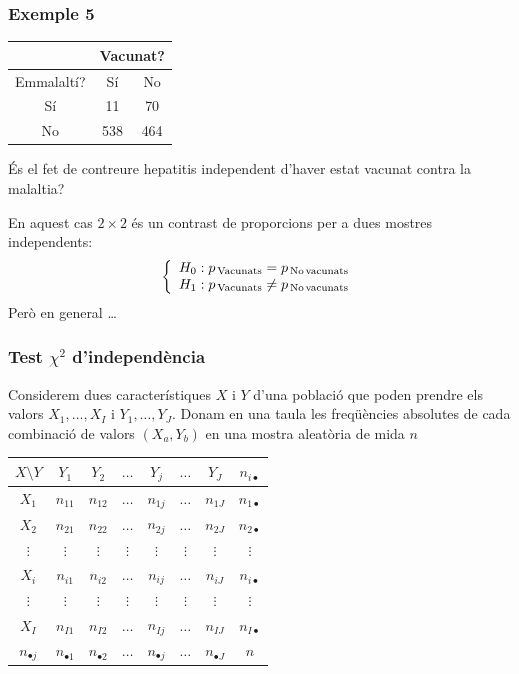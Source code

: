 \documentclass[12pt,t]{beamer}
\theoremstyle{plain}
\theoremstyle{definition}
\begin{document}
\begin{frame}
\frametitle{Exemple 5}

\begin{center}
 \begin{tabular}{c|cc}
\hline &\multicolumn{2}{c}{Vacunat?}\\\hline 
Emmalaltí?& Sí &No \\\hline
Sí &11& 70 \\
No& 538 &464\\\hline
 \end{tabular}
\end{center}
És el fet de contreure hepatitis
independent d'haver estat vacunat contra la malaltia?
\medskip

En aquest cas $2\times 2$ és un contrast de proporcions per a dues mostres independents:
$$
\left\{
\begin{array}{l}
H_0: p_{\,\mathrm{Vacunats}}=p_{\,\mathrm{No\hspace*{0.3ex} vacunats}}\\
H_1: p_{\,\mathrm{Vacunats}}\neq p_{\,\mathrm{No\hspace*{0.3ex} vacunats}}
\end{array}
\right.
$$
Però en general \ldots




\end{frame}


\begin{frame}
\frametitle{Test $\chi^2$ d'independència}
\vspace*{-2ex}

Considerem dues característiques $X$ i $Y$ d'una població que poden prendre els
valors $X_{1},\ldots,X_{I}$ i $Y_{1},\ldots,Y_{J}$. Donam en una taula les freqüències absolutes
de cada combinació de valors $(X_a,Y_b)$ en una mostra aleatòria de mida $n$
\begin{table}
\centering
\begin{tabular}{|c|cccccc|c|}
\hline $X\mbox{\textbackslash} Y$ & $Y_1$ & $Y_2$ & $\ldots$ & $Y_j$ & $\ldots$
& $Y_J$ & $n_{i \bullet}$ \\
\hline $X_1$ & $n_{11}$ & $n_{12}$ & $\ldots$ & $n_{1j}$ & $\ldots$ & $n_{1J}$ &
$n_{1
\bullet}$ \\ $X_2$ & $n_{21}$ & $n_{22}$ & $\ldots$ & $n_{2j}$ & $\ldots$ &
$n_{2J}$ &
$n_{2 \bullet}$ \\ $\vdots$ & $\vdots$ & $\vdots$ & $\vdots$ & $\vdots$ &
$\vdots$ &
$\vdots$ & $\vdots$ \\ $X_i$ & $n_{i1}$ & $n_{i2}$ & $\ldots$ & $n_{ij}$ &
$\ldots$ &
$n_{iJ}$ & $n_{i \bullet}$ \\ $\vdots$ & $\vdots$ & $\vdots$ & $\vdots$ &
$\vdots$ &
$\vdots$ & $\vdots$ & $\vdots$ \\ $X_I$ & $n_{I1}$ & $n_{I2}$ & $\ldots$ &
$n_{Ij}$ &
$\ldots$ & $n_{IJ}$ & $n_{I \bullet}$ \\ \hline $n_{\bullet j}$ & $n_{\bullet
1}$ &
$n_{\bullet 2}$ & $\ldots$ & $n_{\bullet j}$ & $\ldots$ & $n_{\bullet J}$ &
$n$ \\ \hline
\end{tabular}
\end{table}
\end{frame}
\end{document}
